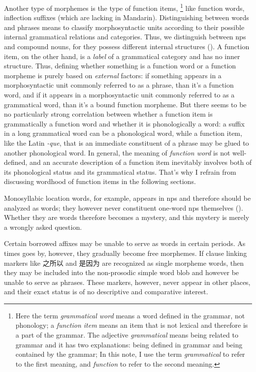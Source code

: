 \documentclass[UTF8, a4paper, oneside, scheme=plain]{ctexrep}
\newcommand*{\term}[1]{\emph{#1}}
\newcommand{\corpus}[1]{\emph{#1}}
\begin{document}
Another type of morphemes is the type of function items,%
\footnote{
    Here the term \term{grammatical word} 
    means a word defined in the grammar, not phonology;
    a \term{function item} means an item that is not lexical
    and therefore is a part of the grammar. 
    The adjective \term{grammatical} means being related to grammar
    and it has two explanations:
    being defined in grammar and being contained by the grammar; 
    In this note, I use the term \term{grammatical} to refer to the first meaning, 
    and \term{function} to refer to the second meaning.
} 
like function words, inflection suffixes (which are lacking in Mandarin).
Distinguishing between words and phrases 
means to classify morphosyntactic units 
according to their possible internal
grammatical relations and categories.
Thus, we distinguish between \acs{np}s and compound nouns, 
for they possess different internal structures 
().
A function item, on the other hand, is a \emph{label} of a grammatical category
and has no inner structure.
Thus, defining whether something is a function word or a function morpheme
is purely based on \emph{external} factors:
if something appears in a morphosyntactic unit commonly referred to as a phrase, 
than it's a function word, 
and if it appears in a morphosyntactic unit commonly referred to as a grammatical word, 
than it's a bound function morpheme.
But there seems to be no particularly strong correlation 
between whether a function item is grammatically a function word
and whether it is phonologically a word: 
a suffix in a long grammatical word can be a phonological word, 
while a function item, like the Latin \corpus{-que}, that is an immediate constituent of a phrase 
may be glued to another phonological word. 
In general, the meaning of \term{function word} is not well-defined, 
and an accurate description of a function item 
inevitably involves both of its phonological status and its grammatical status.
That's why I refrain from discussing wordhood of function items in the following sections.

Monosyllabic location words, 
for example, appears in \acs{np}s 
and therefore should be analyzed as words;
they however never constituent one-word \acs{np}s themselves
().
Whether they are words therefore becomes a mystery,
and this mystery is merely a wrongly asked question.

Certain borrowed affixes may be unable to serve as words in certain periods.
As times goes by, however, they gradually become free morphemes.
If clause linking markers like 之所以 and 是因为 are recognized as single morpheme words,
then they may be included into the non-prosodic simple word blob 
and however be unable to serve as phrases.
These markers, however, never appear in other places,
and their exact status is of no descriptive and comparative interest.
\end{document}
